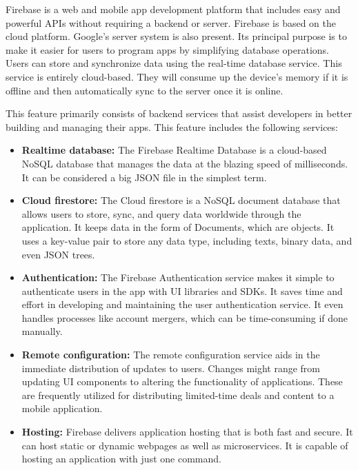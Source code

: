 Firebase is a web and mobile app development platform that includes easy and powerful APIs without requiring a backend or server. Firebase is based on the cloud platform. Google's server system is also present. Its principal purpose is to make it easier for users to program apps by simplifying database operations. Users can store and synchronize data using the real-time database service. This service is entirely cloud-based. They will consume up the device's memory if it is offline and then automatically sync to the server once it is online.

This feature primarily consists of backend services that assist developers in better building and managing their apps. This feature includes the following services:

\begin{itemize}
	\item \textbf{Realtime database:} The Firebase Realtime Database is a cloud-based NoSQL database that manages the data at the blazing speed of milliseconds. It can be considered a big JSON file in the simplest term.
 \item \textbf{Cloud firestore:} The Cloud firestore is a NoSQL document database that allows users to store, sync, and query data worldwide through the application. It keeps data in the form of Documents, which are objects. It uses a key-value pair to store any data type, including texts, binary data, and even JSON trees.
 \item \textbf{Authentication:} The Firebase Authentication service makes it simple to authenticate users in the app with UI libraries and SDKs. It saves time and effort in developing and maintaining the user authentication service. It even handles processes like account mergers, which can be time-consuming if done manually.
 \item \textbf{Remote configuration:} The remote configuration service aids in the immediate distribution of updates to users. Changes might range from updating UI components to altering the functionality of applications. These are frequently utilized for distributing limited-time deals and content to a mobile application.
 \item \textbf{Hosting:} Firebase delivers application hosting that is both fast and secure. It can host static or dynamic webpages as well as microservices. It is capable of hosting an application with just one command.
\end{itemize}



